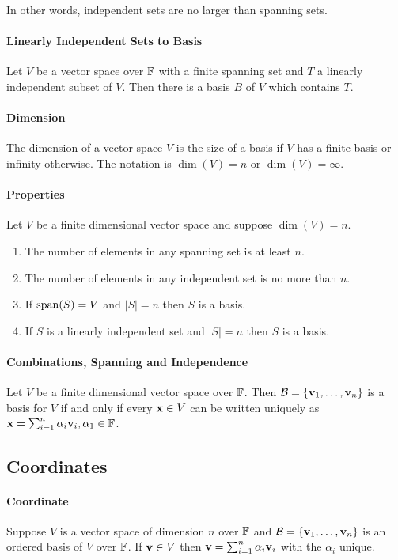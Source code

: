 In other words, independent sets are no larger than spanning sets.

\paragraph{Linearly Independent Sets to Basis}
Let \(V\) be a vector space over \(\mathbb{F}\) with a finite spanning set and \(T\) a linearly independent subset of \(V\). Then there is a basis \(B\) of \(V\) which contains \(T\).

\paragraph{Dimension}
The dimension of a vector space \(V\) is the size of a basis if \(V\) has a finite basis or infinity otherwise. The notation is \(\dim(V) = n\) or \(\dim(V) = \infty\).

\paragraph{Properties}
Let \(V\) be a finite dimensional vector space and suppose \(\dim(V) = n\).
\begin{enumerate}
    \item The number of elements in any spanning set is at least \(n\).
    \item The number of elements in any independent set is no more than \(n\).
    \item If \(\mathrm{span}(S) = V\) and \(|S| = n\) then \(S\) is a basis.
    \item If \(S\) is a linearly independent set and \(|S| = n\) then \(S\) is a basis.
\end{enumerate}

\paragraph{Combinations, Spanning and Independence}
Let \(V\) be a finite dimensional vector space over \(\mathbb{F}\). Then \(\mathcal{B} = \{\mathbf{v}_1, \dots, \mathbf{v}_n\}\) is a basis for \(V\) if and only if every \(\mathbf{x} \in V\) can be written uniquely as \(\mathbf{x} = \sum_{i=1}^n \alpha_i\mathbf{v}_i, \alpha_1 \in \mathbb{F}\).

\subsection{Coordinates}
\paragraph{Coordinate}
Suppose \(V\) is a vector space of dimension \(n\) over \(\mathbb{F}\) and \(\mathcal{B} = \{\mathbf{v}_1, \dots, \mathbf{v}_n\}\) is an ordered basis of \(V\) over \(\mathbb{F}\). If \(\mathbf{v} \in V\) then \(\mathbf{v} = \sum_{i=1}^n \alpha_i\mathbf{v}_i\) with the \(\alpha_i\) unique.

